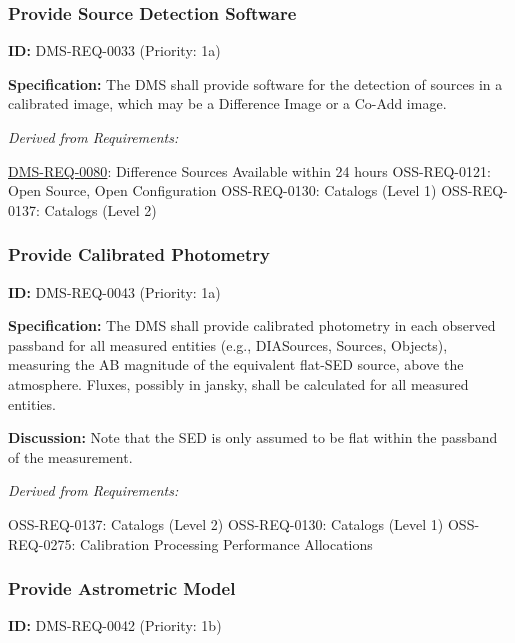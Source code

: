 \documentclass[SE,toc,lsstdraft]{lsstdoc}
\begin{document}
\subsubsection{Provide Source Detection Software}

\label{DMS-REQ-0033}
\textbf{ID:} DMS-REQ-0033 (Priority: 1a)

\textbf{Specification:} The DMS shall provide software for the detection of sources in a calibrated image, which may be a Difference Image or a Co-Add image.

\emph{Derived from Requirements:}

\hyperref[DMS-REQ-0080]{DMS-REQ-0080}:
Difference Sources Available within 24 hours \newline
OSS-REQ-0121:
Open Source, Open Configuration \newline
OSS-REQ-0130:
Catalogs (Level 1) \newline
OSS-REQ-0137:
Catalogs (Level 2) \newline

\subsubsection{Provide Calibrated Photometry}

\label{DMS-REQ-0043}
\textbf{ID:} DMS-REQ-0043 (Priority: 1a)

\textbf{Specification:} The DMS shall provide calibrated photometry in each observed passband for all measured entities (e.g., DIASources, Sources, Objects), measuring the AB magnitude of the equivalent flat-SED source, above the atmosphere. Fluxes, possibly in jansky, shall be calculated for all measured entities.

\textbf{Discussion: }Note that the SED is only assumed to be flat within the passband of the measurement.

\emph{Derived from Requirements:}

OSS-REQ-0137:
Catalogs (Level 2) \newline
OSS-REQ-0130:
Catalogs (Level 1) \newline
OSS-REQ-0275:
Calibration Processing Performance Allocations \newline

\subsubsection{Provide Astrometric Model}

\label{DMS-REQ-0042}
\textbf{ID:} DMS-REQ-0042 (Priority: 1b)
\end{document}
